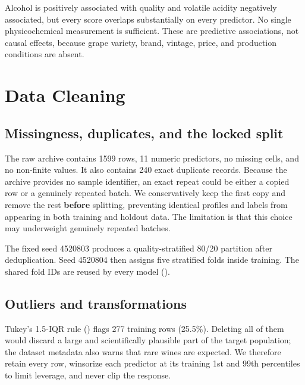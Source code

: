 \documentclass[
  10pt,
]{article}
\newcommand{\tightinputtable}[1]{%
  \begingroup\small\setlength{\tabcolsep}{4pt}\endgroup%
}
\begin{document}
Alcohol is positively associated with quality and volatile acidity
negatively associated, but every score overlaps substantially on every
predictor. No single physicochemical measurement is sufficient. These
are predictive associations, not causal effects, because grape variety,
brand, vintage, price, and production conditions are absent.

\section{Data Cleaning}\label{data-cleaning}

\subsection{Missingness, duplicates, and the locked
split}\label{missingness-duplicates-and-the-locked-split}

The raw archive contains 1599 rows, 11 numeric predictors, no missing
cells, and no non-finite values. It also contains 240 exact duplicate
records. Because the archive provides no sample identifier, an exact
repeat could be either a copied row or a genuinely repeated batch. We
conservatively keep the first copy and remove the rest \textbf{before}
splitting, preventing identical profiles and labels from appearing in
both training and holdout data. The limitation is that this choice may
underweight genuinely repeated batches.

\tightinputtable{../output/tables/tab_p1_data_audit.tex}

The fixed seed 4520803 produces a quality-stratified 80/20 partition
after deduplication. Seed 4520804 then assigns five stratified folds
inside training. The shared fold IDs are reused by every model
().

\tightinputtable{../output/tables/tab_p1_split_summary.tex}

\subsection{Outliers and
transformations}\label{outliers-and-transformations}

Tukey's 1.5-IQR rule () flags 277
training rows (25.5\%). Deleting all of them would discard a large and
scientifically plausible part of the target population; the dataset
metadata also warns that rare wines are expected. We therefore retain
every row, winsorize each predictor at its training 1st and 99th
percentiles to limit leverage, and never clip the response.
\end{document}
